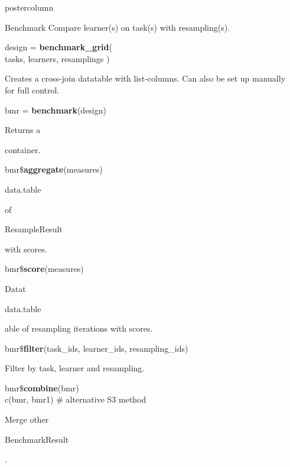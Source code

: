\documentclass{beamer}
\newlength{\columnheight} %
\newcommand{\codeinline}[1]{\begin{codeboxinline}#1\end{codeboxinline}}
\begin{document}
\begin{withoutheader}
\begin{frame}[fragile]{}
\begin{columns}
\begin{column}{.245\textwidth}
			\end{column}
			\begin{column}{.245\textwidth}
				\begin{beamercolorbox}[center]{postercolumn}
					\begin{minipage}{.98\textwidth}
						\parbox[t][\columnheight]{\textwidth}{
							\begin{myblock}{Benchmark}
								Compare learner(s) on task(s) with resampling(s).
								\\
								\begin{codeboxmultiline}[width=19.4cm]
									design = \textbf{benchmark\_grid}(\\
									\hspace*{1ex}tasks, learners, resamplings
									)
								\end{codeboxmultiline}
								Creates a cross-join datatable with list-columns. Can also be set up manually for full control.
								\\
								\begin{codebox}
									bmr = \textbf{benchmark}(design)
								\end{codebox}
								Returns a \codeinline{}
								container.
								\\
								\begin{codebox}
									bmr\$\textbf{aggregate}(measures)
								\end{codebox}
								\codeinline{data.table} of \codeinline{ResampleResult} with scores.
								\\
								\begin{codebox}
									bmr\$\textbf{score}(measures)
								\end{codebox}
								Datat\codeinline{data.table}able of resampling iterations with scores.
								\\
								\begin{codeboxmultiline}[width=26cm]
									{\footnotesize bmr\$\textbf{filter}(task\_ids, learner\_ids, resampling\_ids)}
								\end{codeboxmultiline}
								Filter by task, learner and resampling.
								\\
								\begin{codeboxmultiline}
									bmr\$\textbf{combine}(bmr)\\
									c(bmr, bmr1) \# alternative S3 method
								\end{codeboxmultiline}
								Merge other \codeinline{BenchmarkResult}.
							\end{myblock}
}
\end{minipage}
\end{beamercolorbox}
\end{column}
\end{columns}
\end{frame}
\end{withoutheader}
\end{document}
